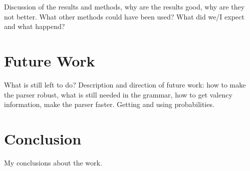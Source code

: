 \documentclass{article}
\begin{document}
Discussion of the results and methods, why are the results good, why are they not better.
What other methods could have been used? What did we/I expect and what happend?


\section{Future Work}
What is still left to do? Description and direction of future work:
how to make the parser robust, what is still needed in the grammar, 
how to get valency information, make the parser faster.
Getting and using probabilities.


\section{Conclusion}
My conclusions about the work.
\end{document}
